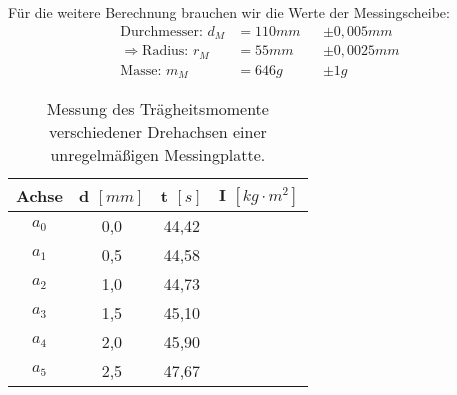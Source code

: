 Für die weitere Berechnung brauchen wir die Werte der Messingscheibe:
\begin{align*}
    \text{Durchmesser: }         d_M   &= 110mm    &&\pm 0,005mm \\
    \Rightarrow \text{Radius: }  r_M   &= 55mm     &&\pm 0,0025mm \\
    \text{Masse: }               m_M   &= 646g     &&\pm 1g
\end{align*}

\begin{table}[h!]
    \begin{tabular}{c | c | c | c}
    Achse & d $[mm]$ & t $[s]$ & I $[kg \cdot m^2]$ \\
    \hline
    $a_0$ & 0,0 & 44,42 & \\ 
    $a_1$ & 0,5 & 44,58 & \\
    $a_2$ & 1,0 & 44,73 & \\
    $a_3$ & 1,5 & 45,10 & \\
    $a_4$ & 2,0 & 45,90 & \\
    $a_5$ & 2,5 & 47,67 & \\
    \hline
    \end{tabular}
    \caption{Messung des Trägheitsmomente verschiedener Drehachsen einer unregelmäßigen Messingplatte.}
    \label{tab:unregelmäßige_messingplatte}
\end{table}